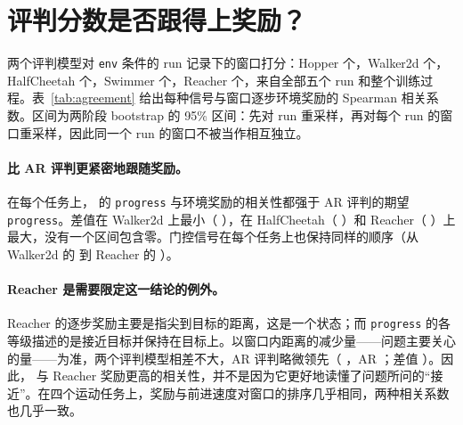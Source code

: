
\section{评判分数是否跟得上奖励？}\label{sec:agreement}

两个评判模型对 \texttt{env} 条件的 run 记录下的窗口打分：Hopper  个，Walker2d  个，HalfCheetah  个，Swimmer  个，Reacher  个，来自全部五个 run 和整个训练过程。表~\ref{tab:agreement} 给出每种信号与窗口逐步环境奖励的 Spearman 相关系数。区间为两阶段 bootstrap 的 95\% 区间：先对 run 重采样，再对每个 run 的窗口重采样，因此同一个 run 的窗口不被当作相互独立。

\begin{table}[t]
\centering\small

\caption{在 \texttt{env} 条件的 run 记录的窗口上（全部种子、整个训练过程），各评判信号与窗口逐步环境奖励的 Spearman 相关系数。\emph{progress}：期望等级除以 4；\emph{healthy}：$p(\text{yes})$；\emph{gated}：两者之积；\emph{sampled}：从 AR 评判的分布中抽取的一个等级，即以温度 1 用文字作答的 AR 评判会给出的结果。}
\label{tab:agreement}
\end{table}

\paragraph{\kev{} 比 AR 评判更紧密地跟随奖励。} 在每个任务上，\kev{} 的 \texttt{progress} 与环境奖励的相关性都强于 AR 评判的期望 \texttt{progress}。差值在 Walker2d 上最小（ ），在 HalfCheetah（ ）和 Reacher（ ）上最大，没有一个区间包含零。门控信号在每个任务上也保持同样的顺序（从 Walker2d 的  到 Reacher 的 ）。

\paragraph{Reacher 是需要限定这一结论的例外。} Reacher 的逐步奖励主要是指尖到目标的距离，这是一个状态；而 \texttt{progress} 的各等级描述的是接近目标并保持在目标上。以窗口内距离的减少量——问题主要关心的量——为准，两个评判模型相差不大，AR 评判略微领先（\kev{} ，AR ；差值  ）。因此，\kev{} 与 Reacher 奖励更高的相关性，并不是因为它更好地读懂了问题所问的“接近”。在四个运动任务上，奖励与前进速度对窗口的排序几乎相同，两种相关系数也几乎一致。

